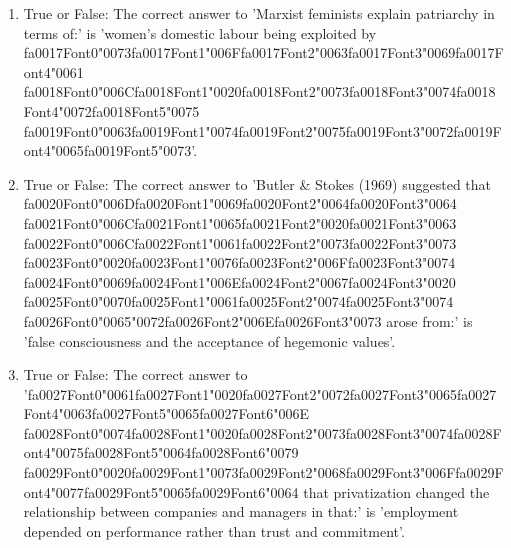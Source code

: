 \documentclass[12pt]{article}
\begin{document}
\begin{enumerate}[label=\arabic*.]
\item True or False: The correct answer to 'Marxist feminists explain patriarchy in terms of:' is 'women's domestic labour being exploited by {\csname fa0017Font0\endcsname\char"0073}{\csname fa0017Font1\endcsname\char"006F}{\csname fa0017Font2\endcsname\char"0063}{\csname fa0017Font3\endcsname\char"0069}{\csname fa0017Font4\endcsname\char"0061} {\csname fa0018Font0\endcsname\char"006C}{\csname fa0018Font1\endcsname\char"0020}{\csname fa0018Font2\endcsname\char"0073}{\csname fa0018Font3\endcsname\char"0074}{\csname fa0018Font4\endcsname\char"0072}{\csname fa0018Font5\endcsname\char"0075} {\csname fa0019Font0\endcsname\char"0063}{\csname fa0019Font1\endcsname\char"0074}{\csname fa0019Font2\endcsname\char"0075}{\csname fa0019Font3\endcsname\char"0072}{\csname fa0019Font4\endcsname\char"0065}{\csname fa0019Font5\endcsname\char"0073}'.
\item True or False: The correct answer to 'Butler \& Stokes (1969) suggested that {\csname fa0020Font0\endcsname\char"006D}{\csname fa0020Font1\endcsname\char"0069}{\csname fa0020Font2\endcsname\char"0064}{\csname fa0020Font3\endcsname\char"0064} {\csname fa0021Font0\endcsname\char"006C}{\csname fa0021Font1\endcsname\char"0065}{\csname fa0021Font2\endcsname\char"0020}{\csname fa0021Font3\endcsname\char"0063} {\csname fa0022Font0\endcsname\char"006C}{\csname fa0022Font1\endcsname\char"0061}{\csname fa0022Font2\endcsname\char"0073}{\csname fa0022Font3\endcsname\char"0073} {\csname fa0023Font0\endcsname\char"0020}{\csname fa0023Font1\endcsname\char"0076}{\csname fa0023Font2\endcsname\char"006F}{\csname fa0023Font3\endcsname\char"0074} {\csname fa0024Font0\endcsname\char"0069}{\csname fa0024Font1\endcsname\char"006E}{\csname fa0024Font2\endcsname\char"0067}{\csname fa0024Font3\endcsname\char"0020} {\csname fa0025Font0\endcsname\char"0070}{\csname fa0025Font1\endcsname\char"0061}{\csname fa0025Font2\endcsname\char"0074}{\csname fa0025Font3\endcsname\char"0074} {\csname fa0026Font0\endcsname\char"0065}{\char"0072}{\csname fa0026Font2\endcsname\char"006E}{\csname fa0026Font3\endcsname\char"0073} arose from:' is 'false consciousness and the acceptance of hegemonic values'.
\item True or False: The correct answer to '{\csname fa0027Font0\endcsname\char"0061}{\csname fa0027Font1\endcsname\char"0020}{\csname fa0027Font2\endcsname\char"0072}{\csname fa0027Font3\endcsname\char"0065}{\csname fa0027Font4\endcsname\char"0063}{\csname fa0027Font5\endcsname\char"0065}{\csname fa0027Font6\endcsname\char"006E} {\csname fa0028Font0\endcsname\char"0074}{\csname fa0028Font1\endcsname\char"0020}{\csname fa0028Font2\endcsname\char"0073}{\csname fa0028Font3\endcsname\char"0074}{\csname fa0028Font4\endcsname\char"0075}{\csname fa0028Font5\endcsname\char"0064}{\csname fa0028Font6\endcsname\char"0079} {\csname fa0029Font0\endcsname\char"0020}{\csname fa0029Font1\endcsname\char"0073}{\csname fa0029Font2\endcsname\char"0068}{\csname fa0029Font3\endcsname\char"006F}{\csname fa0029Font4\endcsname\char"0077}{\csname fa0029Font5\endcsname\char"0065}{\csname fa0029Font6\endcsname\char"0064} that privatization changed the relationship between companies and managers in that:' is 'employment depended on performance rather than trust and commitment'.

\end{enumerate}
\end{document}

